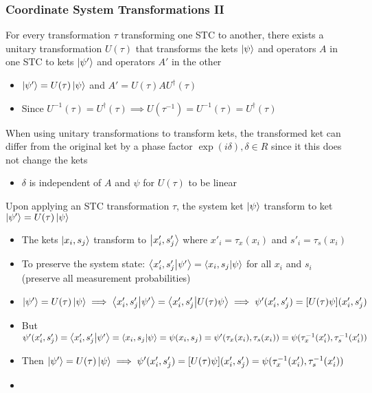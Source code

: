 \documentclass[8pt,t,mathserif,aspectratio=169]{beamer}
\begin{document}
\begin{frame}
  \frametitle{Coordinate System Transformations II}
  \vspace{1mm}
  For every transformation $\tau$ transforming one STC to another, there exists a unitary transformation $U(\tau)$ that transforms the kets $\ket{\psi}$ and operators $A$ in one STC to kets $\ket{\psi'}$ and operators $A'$ in the other
  \begin{itemize}
    \item $\ket{\psi'} = U(\tau) \ket{\psi}$ and $A' = U(\tau) A U^{\dagger}(\tau)$
    \item Since $U^{-1}(\tau) = U^{\dagger}(\tau) \implies U(\tau^{-1}) = U^{-1}(\tau) = U^{\dagger}(\tau)$
  \end{itemize}
  When using unitary transformations to transform kets, the transformed ket can differ from the original ket by a phase factor $\exp(i \delta), \delta \in R$ since it this does not change the kets 
  \begin{itemize}
    \item $\delta$ is independent of $A$ and $\psi$ for $U(\tau)$ to be linear
  \end{itemize}
  Upon applying an STC transformation $\tau$, the system ket $\ket{\psi}$ transform to ket $\ket{\psi'} = U(\tau) \ket{\psi}$
  \begin{itemize}
    \item The kets $\ket{x_i,s_j}$ transform to $\ket{x'_i,s'_j}$ where $x'_i = \tau_x(x_i)$ and $s'_i = \tau_s(x_i)$
    \item To preserve the system state: $\braket{x'_i,s'_j}{\psi'} = \braket{x_i,s_j}{\psi}$ for all $x_i$ and $s_i$ (preserve all measurement probabilities)
    \item $\ket{\psi'} = U(\tau) \ket{\psi} \implies \braket{x'_i,s'_j}{\psi'} = \braket{x'_i,s'_j}{U(\tau) \psi} \implies \psi'(x'_i,s'_j) = [U(\tau) \psi](x'_i,s'_j)$
    \item But $\psi'(x'_i,s'_j) = \braket{x'_i,s'_j}{\psi'} = \braket{x_i,s_j}{\psi} = \psi(x_i,s_j) = \psi'(\tau_x(x_i),\tau_s(x_i)) = \psi(\tau^{-1}_x(x'_i),\tau^{-1}_s(x'_i))$ 
    \item Then $\ket{\psi'} = U(\tau) \ket{\psi} \implies \psi'(x'_i,s'_j) = [U(\tau) \psi](x'_i,s'_j) = \psi(\tau^{-1}_x(x'_i),\tau^{-1}_s(x'_i))$
    \item 
  \end{itemize}
\end{frame}
\end{document}
